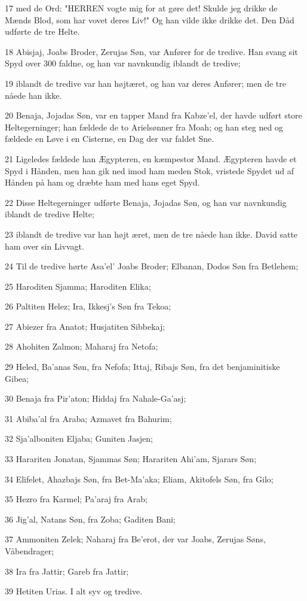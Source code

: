\par 17 med de Ord: "HERREN vogte mig for at gøre det! Skulde jeg drikke de Mænds Blod, som har vovet deres Liv!" Og han vilde ikke drikke det. Den Dåd udførte de tre Helte.
\par 18 Abisjaj, Joabs Broder, Zerujas Søn, var Anfører for de tredive. Han svang sit Spyd over 300 faldne, og han var navnkundig iblandt de tredive;
\par 19 iblandt de tredive var han højtæret, og han var deres Anfører; men de tre nåede han ikke.
\par 20 Benaja, Jojadas Søn, var en tapper Mand fra Kabze'el, der havde udført store Heltegerninger; han fældede de to Arielsønner fra Moah; og han steg ned og fældede en Løve i en Cisterne, en Dag der var faldet Sne.
\par 21 Ligeledes fældede han Ægypteren, en kæmpestor Mand. Ægypteren havde et Spyd i Hånden, men han gik ned imod ham meden Stok, vristede Spydet ud af Hånden på ham og dræbte ham med hans eget Spyd.
\par 22 Disse Heltegerninger udførte Benaja, Jojadas Søn, og han var navnkundig iblandt de tredive Helte;
\par 23 iblandt de tredive var han højt æret, men de tre nåede han ikke. David satte ham over sin Livvagt.
\par 24 Til de tredive hørte Asa'el' Joabs Broder; Elbanan, Dodos Søn fra Betlehem;
\par 25 Haroditen Sjamma; Haroditen Elika;
\par 26 Paltiten Helez; Ira, Ikkesj's Søn fra Tekoa;
\par 27 Abiezer fra Anatot; Husjatiten Sibbekaj;
\par 28 Ahohiten Zalmon; Maharaj fra Netofa;
\par 29 Heled, Ba'anas Søn, fra Nefofa; Ittaj, Ribajs Søn, fra det benjaminitiske Gibea;
\par 30 Benaja fra Pir'aton; Hiddaj fra Nahale-Ga'asj;
\par 31 Abiba'al fra Araba; Azmavet fra Bahurim;
\par 32 Sja'alboniten Eljaba; Guniten Jasjen;
\par 33 Harariten Jonatan, Sjammas Søn; Harariten Ahi'am, Sjarars Søn;
\par 34 Elifelet, Ahazbajs Søn, fra Bet-Ma'aka; Eliam, Akitofels Søn, fra Gilo;
\par 35 Hezro fra Karmel; Pa'araj fra Arab;
\par 36 Jig'al, Natans Søn, fra Zoba; Gaditen Bani;
\par 37 Ammoniten Zelek; Naharaj fra Be'erot, der var Joabs, Zerujas Søns, Våbendrager;
\par 38 Ira fra Jattir; Gareb fra Jattir;
\par 39 Hetiten Urias. I alt syv og tredive.

